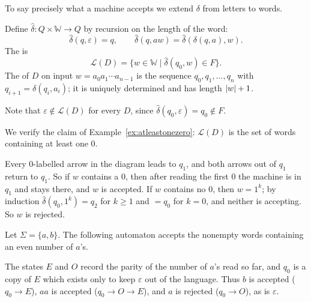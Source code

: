 \documentclass[a4paper]{scrartcl}
\newcommand{\WW}{\mathbb{W}}
\newcommand{\lang}{\mathcal{L}}
\newcommand{\eps}{\varepsilon}
\newcommand{\initarr}[2]{\draw[tra] ($(#1)+#2$) -- (#1);}
\begin{document}
To say precisely what a machine accepts we extend $\delta$ from letters to words.

\begin{definition}
	Define $\hat\delta \colon Q \times \WW \to Q$ by recursion on the length of the word:
	$$\hat\delta(q, \eps) = q, \qquad \hat\delta(q, aw) = \hat\delta(\delta(q,a), w).$$
	The  is
	$$\lang(D) = \{w \in \WW \mid \hat\delta(q_0, w) \in F\}.$$
	The  of $D$ on input $w = a_0a_1\cdots a_{n-1}$ is the sequence $q_0, q_1, \dots, q_n$ with $q_{i+1} = \delta(q_i, a_i)$; it is uniquely determined and has length $\lvert w\rvert + 1$.
\end{definition}

Note that $\eps \notin \lang(D)$ for every $D$, since $\hat\delta(q_0, \eps) = q_0 \notin F$.

\begin{example}
	We verify the claim of Example~\ref{ex:atleastonezero}: $\lang(D)$ is the set of words containing at least one $0$.

	Every $0$-labelled arrow in the diagram leads to $q_1$, and both arrows out of $q_1$ return to $q_1$. So if $w$ contains a $0$, then after reading the first $0$ the machine is in $q_1$ and stays there, and $w$ is accepted. If $w$ contains no $0$, then $w = 1^k$; by induction $\hat\delta(q_0, 1^k) = q_2$ for $k \geq 1$ and $= q_0$ for $k = 0$, and neither is accepting. So $w$ is rejected.
\end{example}

\begin{example}\label{ex:evenas}
	Let $\Sigma = \{a,b\}$. The following automaton accepts the nonempty words containing an even number of $a$'s.
	\begin{center}
	\end{center}
	The states $E$ and $O$ record the parity of the number of $a$'s read so far, and $q_0$ is a copy of $E$ which exists only to keep $\eps$ out of the language. Thus $b$ is accepted ($q_0 \to E$), $aa$ is accepted ($q_0 \to O \to E$), and $a$ is rejected ($q_0 \to O$), as is $\eps$.
\end{example}
\end{document}
